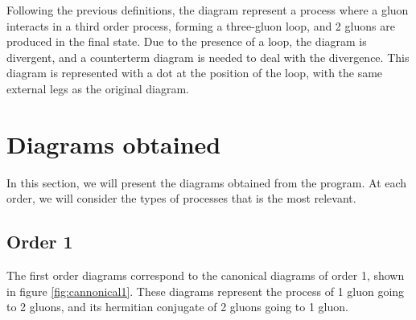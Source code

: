 \documentclass[11pt,a4paper,twoside,pdf]{article}
\numberwithin{equation}{section}
\begin{document}
Following the previous definitions, the diagram represent a process where a gluon
interacts in a third order process, forming a three-gluon loop, and 2 gluons are 
produced in the final state. Due to the presence of a loop, the diagram is
divergent, and a counterterm diagram is needed to deal with the divergence. This 
diagram is represented with a dot at the position of the loop, with the same 
external legs as the original diagram. 

\newpage

\section{Diagrams obtained} \label{sec:diagrams}

In this section, we will present the diagrams obtained from the program. At 
each order, we will consider the types of processes that is the most relevant.


\subsection{Order 1}

The first order diagrams correspond to the canonical diagrams of order 1, shown in 
figure \ref{fig:cannonical1}. These diagrams represent the process of 1 gluon going to 2 gluons,
and its hermitian conjugate of 2 gluons going to 1 gluon.
\end{document}
